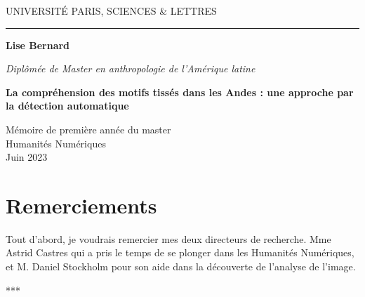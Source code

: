 \documentclass[a4paper, twoside, 12pt]{book}
\begin{document}
\frontmatter

\begin{titlepage}
\begin{center}

\bigskip

\begin{large}
UNIVERSITÉ PARIS, SCIENCES \& LETTRES
\end{large}

\begin{center}\rule{2cm}{0.02cm}\end{center}

\bigskip
\bigskip
\bigskip
\begin{Large}
\textbf{Lise Bernard}\\
\end{Large}
\begin{normalsize}
\textit{Diplômée de Master en anthropologie de l'Amérique latine}\\
\end{normalsize}

\bigskip
\bigskip
\bigskip
\bigskip
\bigskip

\begin{LARGE}
\textbf{La compréhension des motifs tissés dans les Andes : une approche par la détection automatique}\\
\end{LARGE}

\bigskip
\bigskip
\bigskip
\vfill

\begin{large}
Mémoire de première année du master\\
\og Humanités Numériques \fg{} \\
\bigskip
Juin 2023
\end{large}

\end{center}
\end{titlepage}


\section*{Remerciements}

\vspace{30pt}

    Tout d'abord, je voudrais remercier mes deux directeurs de recherche. Mme Astrid Castres qui a pris le temps de se plonger dans les Humanités Numériques, et M. Daniel Stockholm pour son aide dans la découverte de l'analyse de l'image.

\begin{center}
    ***
\end{center}
\end{document}

